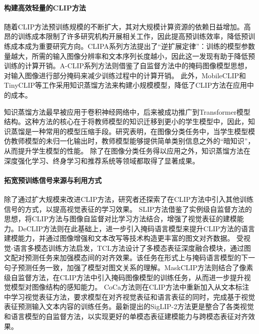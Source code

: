 \paragraph{构建高效轻量的CLIP方法}
随着CLIP方法预训练规模的不断扩大，其对大规模计算资源的依赖日益增加。高昂的训练成本限制了许多研究机构开展相关工作，因此提高预训练效率，降低预训练成本成为重要研究方向。CLIPA系列方法\cite{CLIPA,CLIPA-v2}提出了“逆扩展定律”：训练的模型参数量越大，所需的输入图像分辨率和文本序列长度越小，因此这一发现有助于降低预训练的计算开销。A-CLIP系列方法\cite{ACLIP,FLIP}则借鉴了自监督方法中的掩码图像模型思想，对输入图像进行部分掩码来减少训练过程中的计算开销。
此外，MobileCLIP\cite{MobileCLIP}和TinyCLIP\cite{TinyCLIP}等工作采用知识蒸馏方法\cite{hinton2015knowledge}来构建小规模模型，降低了CLIP方法在应用中的成本。

知识蒸馏方法\cite{hinton2015knowledge,kim2018paraphrasing}最早被应用于卷积神经网络中，后来被成功推广到Transformer模型结构\cite{deit,wang2020minilm}。这种方法的核心在于将教师模型的知识迁移到更小的学生模型中，因此，知识蒸馏是一种常用的模型压缩手段。研究表明，在图像分类任务中，当学生模型模仿教师模型的未归一化输出时，教师模型能够提供简单类别信息之外的“暗知识”\cite{furlanello2018born}，从而提升学生模型的性能。%
除了在图像分类任务得以应用之外，知识蒸馏方法在深度强化学习\cite{chaudhry2018riemannian}、终身学习\cite{zhai2019lifelong}和推荐系统\cite{chen2018adversarial}等领域都取得了显著成果。

\paragraph{拓宽预训练信号来源与利用方式} 
除了通过扩大规模来改进CLIP方法，研究者还探索了在CLIP方法中引入其他训练信号的方式，以提高视觉表征的学习效果。
SLIP方法\cite{SLIP}借鉴了实例级自监督方法的思想，将CLIP方法与图像自监督对比学习方法\cite{chen2020simple}结合，增强了视觉表征的建模能力。DeCLIP方法\cite{li2022supervision}则在此基础上，进一步引入掩码语言模型来提升CLIP方法的语言建模能力，并通过图像增强和文本改写等技术构造更丰富的图文对齐数据。
受视觉-语言多模态训练方法\cite{visualbert}启发，TCL方法\cite{TCL}设计了多模态表征深度融合模块，通过图文配对预测任务来加强模态间的对齐效果。该任务在形式上与掩码语言模型的下一句子预测任务\cite{BERT}一致，加强了模型对图文关系的理解。MaskCLIP方法\cite{he2022masked}则结合了像素级自监督方法，在CLIP方法中引入掩码图像模型的训练任务\cite{he2022masked}，从而进一步提升视觉模型对图像结构的感知能力。
CoCa方法\cite{CoCa}则在CLIP方法中重新加入从文本标注中学习视觉表征方法\cite{desai2021virtex}，要求模型在对齐视觉表征和语言表征的同时，完成基于视觉表征预测输入文本内容的训练任务。最新提出的SigLIP-2方法\cite{siglip-2}更是整合了各类视觉和语言模型的自监督方法，以实现更好的单模态表征建模能力与跨模态表征对齐效果。

